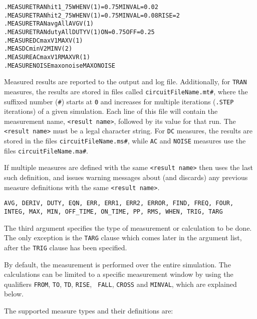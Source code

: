 \begin{Command}
\begin{alltt}
\end{alltt}

\examples
\begin{alltt}
.MEASURE TRAN hit1_75 WHEN V(1)=0.75 MINVAL=0.02
.MEASURE TRAN hit2_75 WHEN V(1)=0.75 MINVAL=0.08 RISE=2
.MEASURE TRAN avgAll AVG V(1)
.MEASURE TRAN dutyAll DUTY V(1) ON=0.75 OFF=0.25
.MEASURE DC maxV1 MAX V(1)
.MEAS DC minV2 MIN V(2)
.MEASURE AC maxV1R MAX VR(1)
.MEASURE NOISE maxonoise MAX ONOISE
\end{alltt}

\arguments

\begin{Arguments}

Measured results are reported to the output and log file.
Additionally, for \texttt{TRAN} measures, the results are stored in
files called \texttt{circuitFileName.mt\#}, where the suffixed number
(\texttt{\#}) starts at \texttt{0} and increases for multiple
iterations (\texttt{.STEP} iterations) of a given simulation. Each
line of this file will contain the measurement name, \texttt{<result
name>}, followed by its value for that run.  The \texttt{<result
name>} must be a legal \Xyce{} character string.  For \texttt{DC} measures,
the results are stored in the files \texttt{circuitFileName.ms\#},
while \texttt{AC} and \texttt{NOISE} measures use the files
\texttt{circuitFileName.ma\#}.

If multiple measures are defined with the same \texttt{<result name>} then
\Xyce{} uses the last such definition, and issues warning messages about
(and discards) any previous measure definitions with the same
\texttt{<result name>}.


\texttt{AVG, DERIV, DUTY, EQN, ERR, ERR1, ERR2, ERROR, FIND, FREQ, FOUR, INTEG, MAX, MIN, OFF\_TIME, ON\_TIME, PP, RMS, WHEN, TRIG, TARG}

The third argument specifies the type of measurement or calculation to
be done. The only exception is the {\tt TARG} clause which comes later
in the argument list, after the {\tt TRIG} clause has been specified.

By default, the measurement is performed over the entire simulation.
The calculations can be limited to a specific measurement window by
using the qualifiers {\tt FROM}, {\tt TO}, {\tt TD}, {\tt RISE}, {\tt
FALL}, {\tt CROSS} and {\tt MINVAL}, which are explained below.

The supported measure types and their definitions are:


\end{Arguments}
\end{Command}
